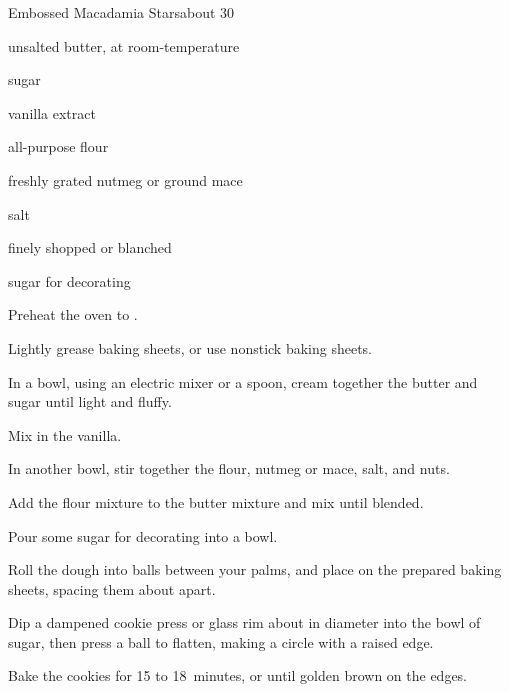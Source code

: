 \begin{recipe}{Embossed Macadamia Stars}{}{about 30}

\begin{ingredients}
\item {} unsalted butter, at room-temperature
\item \C{\half} sugar
\item {} vanilla extract
\item {} all-purpose flour
\item \tp{\half} freshly grated nutmeg or ground mace
\item \tp{\eighth} salt
\item \C{\half} finely shopped  or blanched 
\item sugar for decorating
\end{ingredients}

\begin{directions}
\item Preheat the oven to .
\item Lightly grease baking sheets, or use nonstick baking sheets.
\item In a bowl, using an electric mixer or a spoon, cream together the butter and sugar until light and fluffy.
\item Mix in the vanilla.
\item In another bowl, stir together the flour, nutmeg or mace, salt, and nuts.
\item Add the flour mixture to the butter mixture and mix until blended.
\item Pour some sugar for decorating into a bowl.
\item Roll the dough into \inch{\threequarter}  balls between your palms, and place on the prepared baking sheets, spacing them about  apart.
\item Dip a dampened cookie press or glass rim about \inch{2\quarter} in diameter into the bowl of sugar, then press a ball to flatten, making a circle with a raised edge.
\item Bake the cookies for 15 to 18~minutes, or until golden brown on the edges.
\end{directions}


\end{recipe}
